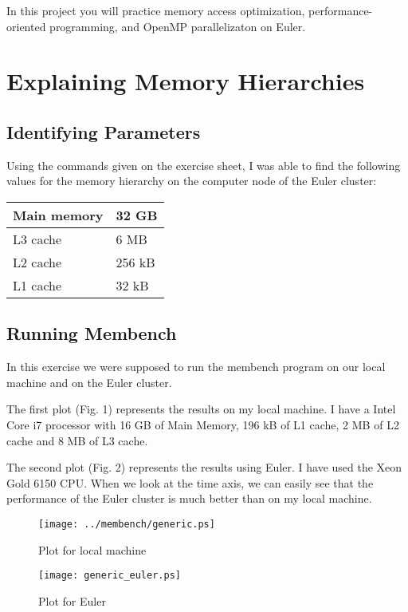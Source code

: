 \documentclass[unicode,11pt,a4paper,oneside,numbers=endperiod,openany]{scrartcl}
\begin{document}
\setassignment
{}

\newline

\assignmentpolicy
In this project you will practice memory access optimization, performance-oriented programming, and OpenMP parallelizaton 
on Euler.

\section{Explaining Memory Hierarchies }

\subsection{Identifying Parameters}
Using the commands given on the exercise sheet, I was able to find the following values for the memory hierarchy on the computer node of the Euler cluster:
\begin{center}
    \begin{tabular}{ |l|l| }
    \hline
    Main memory & 32 GB \\ \hline
    L3 cache & 6 MB \\ \hline
    L2 cache & 256 kB \\ \hline
    L1 cache & 32 kB \\
    \hline
    \end{tabular}
\end{center}

\subsection{Running Membench}
In this exercise we were supposed to run the membench program on our local machine and on the Euler cluster.

The first plot (Fig. 1) represents the results on my local machine. I have a Intel Core i7 processor with 16 GB of Main Memory, 196 kB of L1 cache, 2 MB of L2 cache and 8 MB of L3 cache.

The second plot (Fig. 2) represents the results using Euler. I have used the Xeon Gold 6150 CPU.
When we look at the time axis, we can easily see that the performance of the Euler cluster is much better than on my local machine.
\begin{figure}[h!]
    \centering
    \texttt{[image: ../membench/generic.ps]}
    \caption{Plot for local machine}
\end{figure}
\begin{figure}[h!]
    \centering
    \texttt{[image: generic\_euler.ps]}
    \caption{Plot for Euler}
\end{figure}
\end{document}
